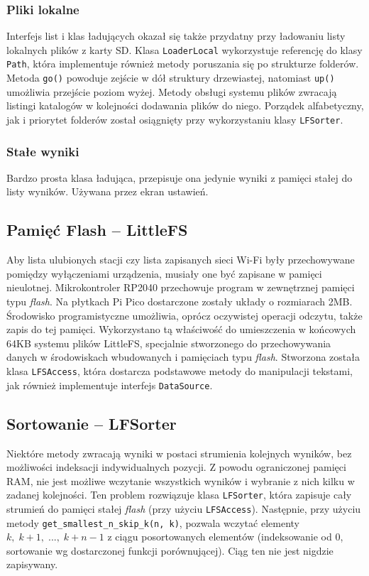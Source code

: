 \documentclass[polish]{aghengthesis}
\begin{document}
			\subsubsection{Pliki lokalne}
				Interfejs list i klas ładujących okazał się także przydatny przy ładowaniu listy lokalnych plików z karty SD. Klasa \lstinline|LoaderLocal| wykorzystuje referencję do klasy \lstinline|Path|, która implementuje również metody poruszania się po strukturze folderów. Metoda \lstinline|go()| powoduje zejście w dół struktury drzewiastej, natomiast \lstinline|up()| umożliwia przejście poziom wyżej. Metody obsługi systemu plików zwracają listingi katalogów w kolejności dodawania plików do niego. Porządek alfabetyczny, jak i priorytet folderów został osiągnięty przy wykorzystaniu klasy \lstinline|LFSorter|.
				
			\subsubsection{Stałe wyniki}
				Bardzo prosta klasa ładująca, przepisuje ona jedynie wyniki z pamięci stałej do listy wyników. Używana przez ekran ustawień.
				
		\subsection{Pamięć Flash -- LittleFS}
			Aby lista ulubionych stacji czy lista zapisanych sieci Wi-Fi były przechowywane pomiędzy wyłączeniami urządzenia, musiały one być zapisane w pamięci nieulotnej. Mikrokontroler RP2040 przechowuje program w zewnętrznej pamięci typu \textit{flash}. Na płytkach Pi Pico dostarczone zostały układy o rozmiarach 2MB. Środowisko programistyczne umożliwia, oprócz oczywistej operacji odczytu, także zapis do tej pamięci. Wykorzystano tą właściwość do umieszczenia w końcowych 64KB systemu plików LittleFS\textsuperscript{\cite{littlefs}}, specjalnie stworzonego do przechowywania danych w środowiskach wbudowanych i pamięciach typu \textit{flash}. Stworzona została klasa \lstinline|LFSAccess|, która dostarcza podstawowe metody do manipulacji tekstami, jak również implementuje interfejs \lstinline|DataSource|.
			
		\subsection{Sortowanie -- LFSorter}
			Niektóre metody zwracają wyniki w postaci strumienia kolejnych wyników, bez możliwości indeksacji indywidualnych pozycji. Z powodu ograniczonej pamięci RAM, nie jest możliwe wczytanie wszystkich wyników i wybranie z nich kilku w zadanej kolejności. Ten problem rozwiązuje klasa \lstinline|LFSorter|, która zapisuje cały strumień do pamięci stałej \textit{flash} (przy użyciu \lstinline|LFSAccess|). Następnie, przy użyciu metody \lstinline|get_smallest_n_skip_k(n, k)|, pozwala wczytać elementy $k,\; k+1,\; ...,\; k+n-1$ z ciągu posortowanych elementów (indeksowanie od 0, sortowanie wg dostarczonej funkcji porównującej). Ciąg ten nie jest nigdzie zapisywany.
			
\end{document}
